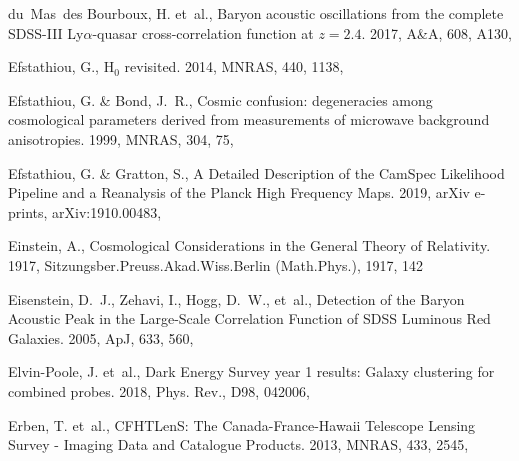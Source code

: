 \documentclass[longauth,traditabstract]{aa}
\def\aap{{A\&A}}
\def\apj{{ApJ}}
\def\mnras{{MNRAS}}
\begin{document}
\begin{thebibliography}{379}
du~Mas~des Bourboux, H. {et~al.}, {Baryon acoustic oscillations from the
  complete SDSS-III Ly$\alpha$-quasar cross-correlation function at $z=2.4$}.
  2017, \aap, 608, A130, 

{Efstathiou}, G., {H$_{0}$ revisited}. 2014, \mnras, 440, 1138,

{Efstathiou}, G. \& {Bond}, J.~R., {Cosmic confusion: degeneracies among
  cosmological parameters derived from measurements of microwave background
  anisotropies}. 1999, \mnras, 304, 75, 

{Efstathiou}, G. \& {Gratton}, S., {A Detailed Description of the CamSpec
  Likelihood Pipeline and a Reanalysis of the Planck High Frequency Maps}.
  2019, arXiv e-prints, arXiv:1910.00483, 

Einstein, A., {Cosmological Considerations in the General Theory of
  Relativity}. 1917, Sitzungsber.Preuss.Akad.Wiss.Berlin (Math.Phys.), 1917,
  142

{Eisenstein}, D.~J., {Zehavi}, I., {Hogg}, D.~W., {et~al.}, {Detection of the
  Baryon Acoustic Peak in the Large-Scale Correlation Function of SDSS Luminous
  Red Galaxies}. 2005, \apj, 633, 560, 

Elvin-Poole, J. {et~al.}, {Dark Energy Survey year 1 results: Galaxy clustering
  for combined probes}. 2018, Phys. Rev., D98, 042006, 

Erben, T. {et~al.}, {CFHTLenS: The Canada-France-Hawaii Telescope Lensing
  Survey - Imaging Data and Catalogue Products}. 2013, \mnras, 433, 2545,


\end{thebibliography}
\end{document}
